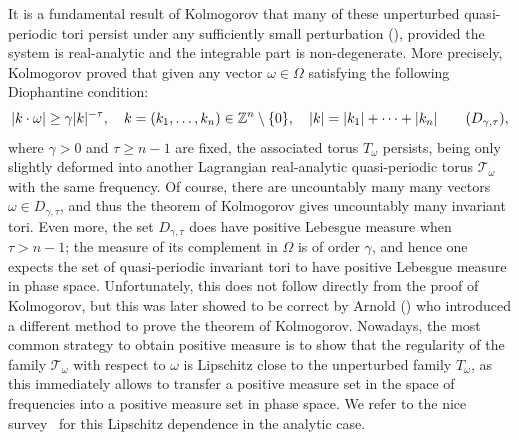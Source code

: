 \documentclass[JEP,XML,SOM,Unicode]{cedram}
\let\mathcal\mathscr
\numberwithin{equation}{section}
\theoremstyle{plain}
\theoremstyle{definition}
\newcommand{\Z}{\mathbb{Z}}
\begin{document}
It is a fundamental result of Kolmogorov that many of these unperturbed quasi-periodic tori persist under any sufficiently small perturbation (\cite{Kol54}), provided the system is real-analytic and the integrable part is non-degenerate. More precisely, Kolmogorov proved that given any vector $\omega \in \Omega$ satisfying the following Diophantine condition:
\begin{equation}\label{dioph}
|k\cdot \omega| \geq \gamma |k|^{-\tau}, \quad k=(k_1,\dots,k_n) \in \Z^n\setminus\{0\}, \quad |k|=|k_1|+\cdots+|k_n| \tag{$D_{\gamma,\tau}$},
\end{equation}
where $\gamma>0$ and $\tau \geq n-1$ are fixed, the associated torus $T_{\omega}$ persists, being only slightly deformed into another Lagrangian real-analytic quasi-periodic torus $\mathcal{T}_\omega$ with the same frequency. Of course, there are uncountably many many vectors $\omega \in D_{\gamma,\tau}$, and thus the theorem of Kolmogorov gives uncountably many invariant tori. Even more, the set $D_{\gamma,\tau}$ does have positive Lebesgue measure when $\tau>n-1$; the measure of its complement in $\Omega$ is of order $\gamma$, and hence one expects the set of quasi-periodic invariant tori to have positive Lebesgue measure in phase space. Unfortunately, this does not follow directly from the proof of Kolmogorov, but this was later showed to be correct by Arnold (\cite{Arn63a}) who introduced a different method to prove the theorem of Kolmogorov. Nowadays, the most common strategy to obtain positive measure is to show that the regularity of the family $\mathcal{T}_\omega$ with respect to $\omega$ is Lipschitz close to the unperturbed family $T_\omega$, as this immediately allows to transfer a positive measure set in the space of frequencies into a positive measure set in phase space. We refer to the nice survey~\cite{Pos01} for this Lipschitz dependence in the analytic case.
\end{document}

